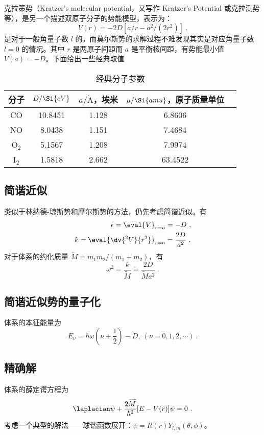 

克拉策势（Kratzer's molecular potential，又写作 Kratzer's Potential 或克拉测势等），是另一个描述双原子分子的势能模型，表示为：
\begin{equation}
V(r) = -2D [a/r - a^2/(2r^2)] ~.
\end{equation}
是对于一般角量子数 $l$ 的，而莫尔斯势的求解过程不难发现其实是对应角量子数 $l=0$ 的情况。其中 $r$ 是两原子间距而 $a$ 是平衡核间距，有势能最小值 $V(a) = -D$。下面给出一些经典取值
\begin{table}[ht]
\centering
\caption{经典分子参数}\label{tab_kratPo1}
\begin{tabular}{|c|c|c|c|c|}
\hline
分子 & $D/\Si{eV}$ & $a/\mathring{\text{A}}$，埃米 & $\mu/\Si{amu}$，原子质量单位\\
\hline
CO & 10.8451 & 1.128 & 6.8606 \\
\hline
NO & 8.0438 & 1.151 & 7.4684 \\
\hline
O$_2$ & 5.1567 & 1.208 & 7.9974 \\
\hline
I$_2$ & 1.5818 & 2.662 & 63.4522 \\
\hline
\end{tabular}
\end{table}

\subsection{简谐近似}
类似于林纳德-琼斯势和摩尔斯势的方法，仍先考虑简谐近似。有
\begin{equation}
\begin{aligned}
\epsilon = \eval{V}_{r=a} &= -D ~, \\
k = \eval{\dv{^2 V}{r^2}}_{r=a} &= \frac{2D}{a^2} ~.
\end{aligned}
\end{equation}
对于体系的约化质量 $\widetilde M = m_1m_2/(m_1+m_2)$，有
$$\omega^2 = \frac{k}{\widetilde M} = \frac{2D}{\widetilde M a^2} ~.$$

\subsection{简谐近似势的量子化}
体系的本征能量为
\begin{equation}
E_\nu = \hbar \omega\left(\nu + \frac12\right) - D, \ (\nu = 0, 1, 2, \cdots) ~.
\end{equation}

\subsection{精确解}
体系的薛定谔方程为
\begin{equation}
\laplacian \psi + \frac{2 \widetilde M}{\hbar^2} [E - V(r)] \psi = 0~.
\end{equation}
考虑一个典型的解法——球谐函数展开：$\psi = R(r) Y_{l, m} (\theta, \phi)$。